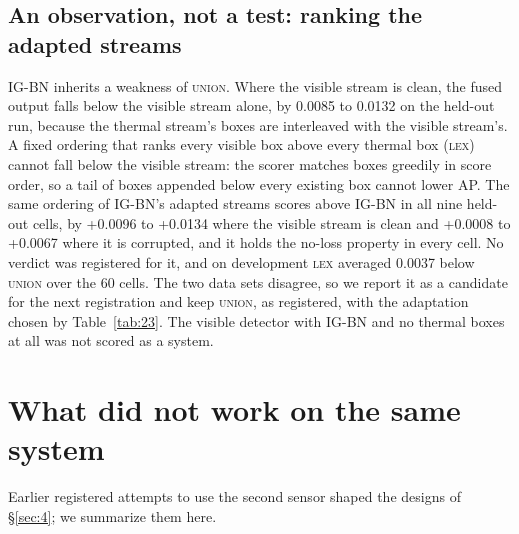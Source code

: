 \documentclass[10pt]{article}
\begin{document}
\subsection{An observation, not a test: ranking the adapted streams}\label{sec:5.4}
IG-BN inherits a weakness of \textsc{union}. Where the visible stream is clean, the fused output falls below the visible stream alone, by 0.0085 to 0.0132 on the held-out run, because the thermal stream's boxes are interleaved with the visible stream's. A fixed ordering that ranks every visible box above every thermal box (\textsc{lex}) cannot fall below the visible stream: the scorer matches boxes greedily in score order, so a tail of boxes appended below every existing box cannot lower AP. The same ordering of IG-BN's adapted streams scores above IG-BN in all nine held-out cells, by +0.0096 to +0.0134 where the visible stream is clean and +0.0008 to +0.0067 where it is corrupted, and it holds the no-loss property in every cell. No verdict was registered for it, and on development \textsc{lex} averaged 0.0037 below \textsc{union} over the 60 cells. The two data sets disagree, so we report it as a candidate for the next registration and keep \textsc{union}, as registered, with the adaptation chosen by Table~\ref{tab:23}. The visible detector with IG-BN and no thermal boxes at all was not scored as a system.

\section{What did not work on the same system}\label{sec:6}
Earlier registered attempts to use the second sensor shaped the designs of \S\ref{sec:4}; we summarize them here.
\end{document}

